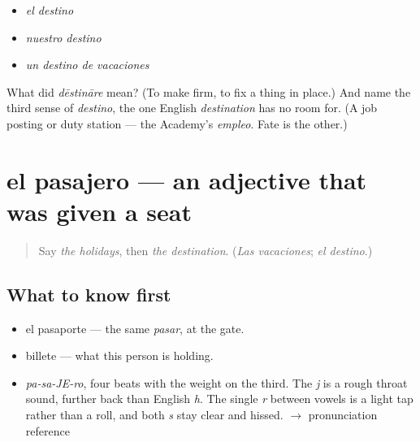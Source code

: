 \begin{itemize}
\raggedright
  \item \emph{el destino}
  \item \emph{nuestro destino}
  \item \emph{un destino de vacaciones}
\end{itemize}

\begin{tcolorbox}[breakable,colback=teal!4,colframe=teal!35!black,title={Before you move on}]
What did \emph{dēstināre} mean? (To make firm, to fix a thing in place.) And name the third sense of \emph{destino}, the one English \emph{destination} has no room for. (A job posting or duty station — the Academy's \emph{empleo}. Fate is the other.)
\end{tcolorbox}
\section[el pasajero]{el pasajero — an adjective that was given a seat}

\label{lesson:ES-C392-pasajero}



\begin{quote}
Say \emph{the holidays}, then \emph{the destination}. (\emph{Las vacaciones}; \emph{el destino}.)
\end{quote}

\subsection*{What to know first}
\begin{itemize}
\raggedright
  \item el pasaporte — the same \emph{pasar}, at the gate.
  \item billete — what this person is holding.
\end{itemize}

\begin{sounds}
\begin{itemize}
\raggedright
  \item \emph{pa-sa-JE-ro}, four beats with the weight on the third. The \emph{j} is a rough throat sound, further back than English \emph{h}. The single \emph{r} between vowels is a light tap rather than a roll, and both \emph{s} stay clear and hissed. $\to$ pronunciation reference
\end{itemize}
\end{sounds}

